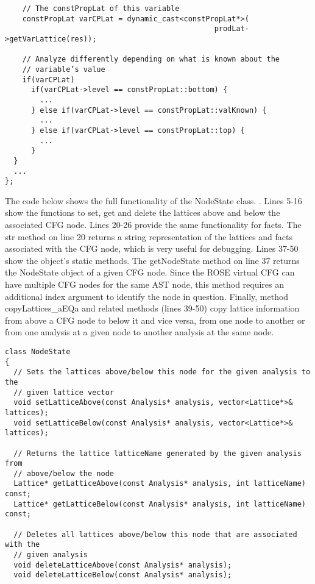 {\begin{frame}
\begin{lstlisting}
    // The constPropLat of this variable
    constPropLat varCPLat = dynamic_cast<constPropLat*>(
                                                prodLat->getVarLattice(res));

    // Analyze differently depending on what is known about the 
    // variable’s value 
    if(varCPLat) 
      if(varCPLat->level == constPropLat::bottom) {
        ...
      } else if(varCPLat->level == constPropLat::valKnown) {
        ...
      } else if(varCPLat->level == constPropLat::top) {
        ...
      }
  }
  ...
};
\end{lstlisting}
\end{frame}

The code below shows the full functionality of the {\scriptsize NodeState} class. . Lines 5-16 show the functions to set, get and delete the lattices above and below the associated CFG node.  Lines 20-26 provide the same functionality for facts. The {\scriptsize str} method on line 20 returns a string representation of the lattices and facts associated with the CFG node, which is very useful for debugging. Lines 37-50 show the object’s static methods. The {\scriptsize getNodeState} method on line 37 returns the {\scriptsize NodeState} object of a given CFG node. Since the ROSE virtual CFG can have multiple CFG nodes for the same AST node, this method requires an additional index argument to identify the node in question. Finally, method copyLattices\_aEQa and related methods (lines 39-50) copy lattice information from above a CFG node to below it and vice versa, from one node to another or from one analysis at a given node to another analysis at the same node.  

\begin{frame}
\centering
\begin{lstlisting}
class NodeState
{
  // Sets the lattices above/below this node for the given analysis to the   
  // given lattice vector
  void setLatticeAbove(const Analysis* analysis, vector<Lattice*>& lattices);
  void setLatticeBelow(const Analysis* analysis, vector<Lattice*>& lattices);
  
  // Returns the lattice latticeName generated by the given analysis from 
  // above/below the node
  Lattice* getLatticeAbove(const Analysis* analysis, int latticeName) const;
  Lattice* getLatticeBelow(const Analysis* analysis, int latticeName) const;
  
  // Deletes all lattices above/below this node that are associated with the 
  // given analysis
  void deleteLatticeAbove(const Analysis* analysis);
  void deleteLatticeBelow(const Analysis* analysis);
  

\end{lstlisting}
\end{frame}}
